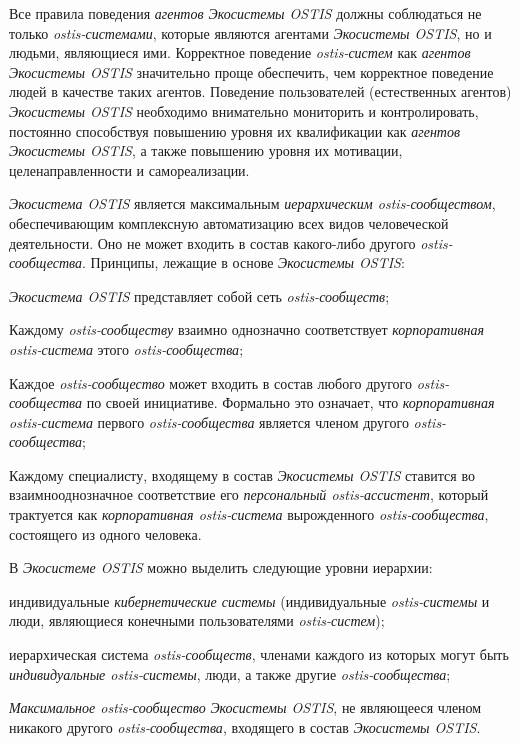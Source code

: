 Все правила поведения \textit{агентов Экосистемы OSTIS} должны соблюдаться не только \textit{ostis-системами}, которые являются агентами \textit{Экосистемы OSTIS}, но и людьми, являющиеся ими. 
Корректное поведение \textit{ostis-систем} как \textit{агентов Экосистемы OSTIS} значительно проще обеспечить, чем корректное поведение людей в качестве таких агентов. 
Поведение пользователей (естественных агентов) \textit{Экосистемы OSTIS} необходимо внимательно мониторить и контролировать, постоянно способствуя повышению уровня их квалификации как \textit{агентов Экосистемы OSTIS}, а также повышению уровня их мотивации, целенаправленности и самореализации.

\textit{Экосистема OSTIS} является максимальным \textit{иерархическим ostis-сообществом}, обеспечивающим комплексную автоматизацию всех видов человеческой деятельности. 
Оно не может входить в состав какого-либо другого \textit{ostis-сообщества}. 
Принципы, лежащие в основе \textit{Экосистемы OSTIS}:
\begin{textitemize}
    \item \textit{Экосистема OSTIS} представляет собой сеть \textit{ostis-сообществ};
    \item Каждому \textit{ostis-сообществу} взаимно однозначно соответствует \textit{корпоративная ostis-система} этого \textit{ostis-сообщества};
    \item Каждое \textit{ostis-сообщество} может входить в состав любого другого \textit{ostis-сообщества} по своей инициативе. Формально это означает, что \textit{корпоративная ostis-система} первого \textit{ostis-сообщества} является членом другого \textit{ostis-сообщества};
    \item Каждому специалисту, входящему в состав \textit{Экосистемы OSTIS} ставится во взаимнооднозначное соответствие его \textit{персональный ostis-ассистент}, который трактуется как \textit{корпоративная ostis-система} вырожденного \textit{ostis-сообщества}, состоящего из одного человека.
\end{textitemize}

В \textit{Экосистеме OSTIS} можно выделить следующие уровни иерархии:
\begin{textitemize}
    \item индивидуальные \textit{кибернетические системы} (индивидуальные \textit{ostis-системы} и люди, являющиеся конечными пользователями \textit{ostis-систем});
    \item иерархическая система \textit{ostis-сообществ}, членами каждого из которых могут быть \textit{индивидуальные ostis-системы}, люди, а также другие \textit{ostis-сообщества};
    \item \textit{Максимальное ostis-сообщество} \textit{Экосистемы OSTIS}, не являющееся членом никакого другого \textit{ostis-сообщества}, входящего в состав \textit{Экосистемы OSTIS}.
\end{textitemize}

